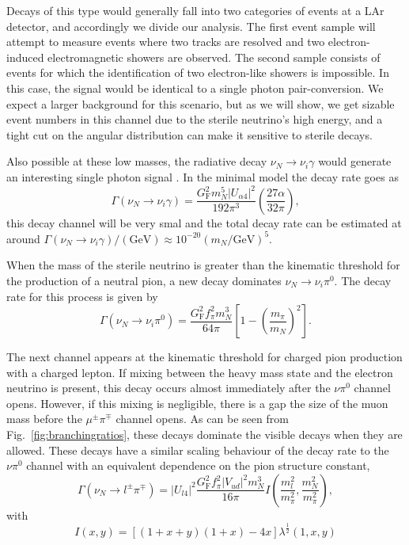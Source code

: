 \documentclass[11pt, a4paper]{article}
\newcommand{\reffig}[1]{Fig.~\ref{#1}}
\begin{document}
%
Decays of this type would generally fall into two categories of events at a LAr
detector, and accordingly we divide our analysis. The first event sample will
attempt to measure events where two tracks are resolved and two
electron-induced electromagnetic showers are observed.
%
The second sample consists of events for which the identification of two
electron-like showers is impossible. In this case, the signal would be identical
to a single photon pair-conversion. We expect a larger background for this
scenario, but as we will show, we get sizable event numbers in this channel due
to the sterile neutrino's high energy, and a tight cut on the angular
distribution can make it sensitive to sterile decays.

Also possible at these low masses, the radiative decay
$\nu_N\to\nu_i\gamma$ would generate an interesting single photon
signal \cite{PhysRevD.25.766}. In the minimal model the decay rate goes as
%
\[ \Gamma(\nu_N\to\nu_i\gamma) = \frac{G_\text{F}^2m_N^5 |U_{\alpha 4}|^2}{192 \pi^3} \left( \frac{27 \alpha}{32 \pi} \right), \]
%
this decay channel will be very smal and the total decay rate can be estimated
at around $\Gamma(\nu_N\to\nu_i\gamma)/(\text{GeV}) \approx 10^{-20}
(m_N/\text{GeV})^5$.  

When the mass of the sterile neutrino is greater than the kinematic threshold
for the production of a neutral pion, a new decay dominates $\nu_N\to\nu_i
\pi^0$. The decay rate for this process is given by
%
\[ \Gamma\left(\nu_N \to \nu_i \pi^0\right) =
\frac{G_\text{F}^2f_\pi^2m_N^3}{64\pi} \left[1-\left( \frac{m_\pi}{m_N}
\right)^2\right].  \]

The next channel appears at the kinematic threshold for charged pion production
with a charged lepton. If mixing between the heavy mass state and the electron
neutrino is present, this decay occurs almost immediately after the $\nu\pi^0$
channel opens. However, if this mixing is negligible, there is a gap the size of
the muon mass before the $\mu^\pm\pi^\mp$ channel opens. As can be seen from
\reffig{fig:branchingratios}, these decays dominate the visible decays when
they are allowed. These decays have a similar scaling behaviour of the decay
rate to the $\nu\pi^0$ channel with an equivalent dependence on the pion
structure constant,
%
\[ \Gamma\left(\nu_N \to l^\pm\pi^\mp\right) =
	\left|U_{l4}\right|^2\frac{G_\text{F}^2f_\pi^2 |V_{ud}|^2  m_N^3}{16\pi}I\left(\frac{m_l^2}{m_\pi^2} , \frac{m_N^2}{m_\pi^2}\right) ,
\]
with 
\[
	I(x,y) = \left[ \left( 1+x+y\right) \left(1+x\right) -4 x\right] \lambda^\frac{1}{2}\left(1,x,y\right)
\]
\end{document}
